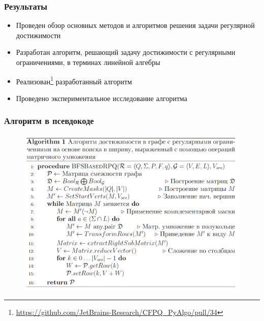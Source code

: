 \documentclass{beamer}
\begin{document}
\begin{frame}
  \frametitle{Результаты}
  \begin{itemize}
    \item Проведен обзор основных методов и алгоритмов решения задачи регулярной достижимости 
    \item Разработан алгоритм, решающий задачу достижимости с регулярными ограничениями, в терминах линейной алгебры
    \item Реализован\footnote{\href{https://github.com/JetBrains-Research/CFPQ_PyAlgo/pull/34}{https://github.com/JetBrains-Research/CFPQ\_PyAlgo/pull/34}} разработанный алгоритм
    \item Проведено экспериментальное исследование алгоритма
  \end{itemize}
\end{frame}

\appendix

\begin{frame}[fragile]
  \frametitle{Алгоритм в псевдокоде}
  \begin{figure}[h!]
      \includegraphics[width=0.9\linewidth]{pictures/pseudocode.PNG}
  \end{figure}
\end{frame}
\end{document}
